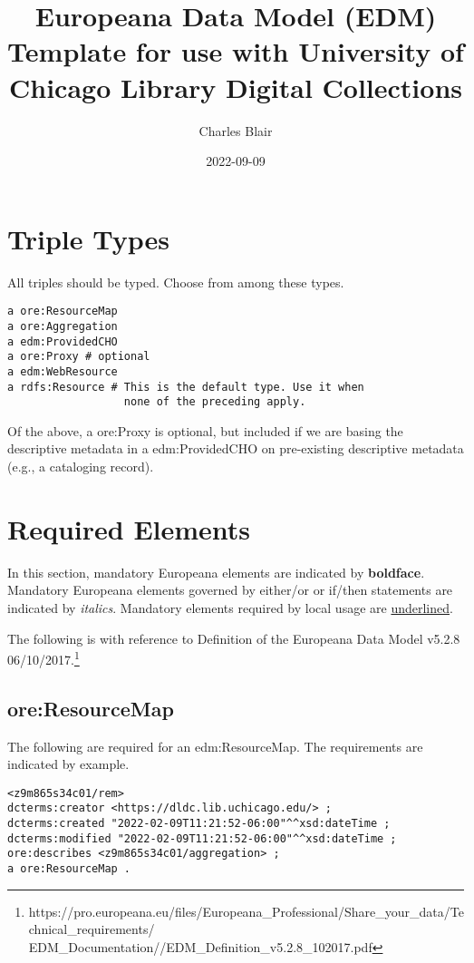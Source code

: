 \documentclass[11pt]{article}
\date{2022-09-09}
\title{Europeana Data Model (EDM) Template for use with University of Chicago Library Digital Collections}
\author{Charles Blair}
\begin{document}
\maketitle

\section{Triple Types}
All triples should be typed. Choose from among these types.

\begin{lstlisting}
a ore:ResourceMap
a ore:Aggregation
a edm:ProvidedCHO
a ore:Proxy # optional
a edm:WebResource
a rdfs:Resource # This is the default type. Use it when
                  none of the preceding apply.
\end{lstlisting}

Of the above, a ore:Proxy is optional, but included if we are basing the descriptive metadata in a edm:ProvidedCHO on pre-existing descriptive metadata (e.g., a cataloging record).

\section{Required Elements}
In this section, mandatory Europeana elements are indicated by \textbf{boldface}. Mandatory Europeana elements governed by either/or or if/then statements are indicated by \textit{italics}. Mandatory elements required by local usage are \underline{underlined}.

The following is with reference to Definition of the Europeana Data Model v5.2.8 06/10/2017.\footnote{https://pro.europeana.eu/files/Europeana\_Professional/Share\_your\_data/Technical\_requirements/
EDM\_Documentation//EDM\_Definition\_v5.2.8\_102017.pdf}

\subsection{ore:ResourceMap}

The following are required for an edm:ResourceMap. The requirements are indicated by example.

\begin{verbatim}
<z9m865s34c01/rem>
dcterms:creator <https://dldc.lib.uchicago.edu/> ;
dcterms:created "2022-02-09T11:21:52-06:00"^^xsd:dateTime ;
dcterms:modified "2022-02-09T11:21:52-06:00"^^xsd:dateTime ;
ore:describes <z9m865s34c01/aggregation> ;
a ore:ResourceMap .
\end{verbatim}
\end{document}
